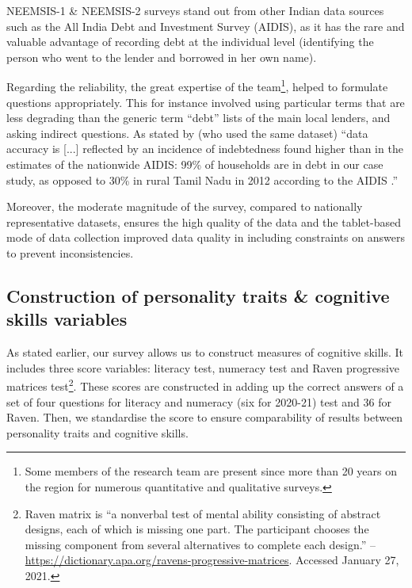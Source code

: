 \documentclass[a4paper, 11pt, onecolumn]{article}
\begin{document}
NEEMSIS-1 \& NEEMSIS-2 surveys stand out from other Indian data sources such as the All India Debt and Investment Survey (AIDIS), as it has the rare and valuable advantage of recording debt at the individual level (identifying the person who went to the lender and borrowed in her own name).

Regarding the reliability, the great expertise of the team\footnote{Some members of the research team are present since more than 20 years on the region for numerous quantitative and qualitative surveys.}, helped to formulate questions appropriately.
This for instance involved using particular terms that are less degrading than the generic term ``debt'' lists of the main local lenders, and asking indirect questions.
As stated by \cite{Reboul2021} (who used the same dataset) ``data accuracy is [...] reflected by an incidence of indebtedness found higher than in the estimates of the nationwide AIDIS: 99\% of households are in debt in our case study, as opposed to 30\% in rural Tamil Nadu in 2012 according to the AIDIS \citep{NSSO2014}.'' 

Moreover, the moderate magnitude of the survey, compared to nationally representative datasets, ensures the high quality of the data and the tablet-based mode of data collection improved data quality in including constraints on answers to prevent inconsistencies. 




	\subsection{Construction of personality traits \& cognitive skills variables }

As stated earlier, our survey allows us to construct measures of cognitive skills.
It includes three score variables: literacy test, numeracy test and Raven progressive matrices test\footnote{Raven matrix is ``a nonverbal test of mental ability consisting of abstract designs, each of which is missing one part. The participant chooses the missing component from several alternatives to complete each design.'' -- \url{https://dictionary.apa.org/ravens-progressive-matrices}. Accessed January 27, 2021.}.
These scores are constructed in adding up the correct answers of a set of four questions for literacy and numeracy (six for 2020-21) test and 36 for Raven.
Then, we standardise the score to ensure comparability of results between personality traits and cognitive skills.
\end{document}
